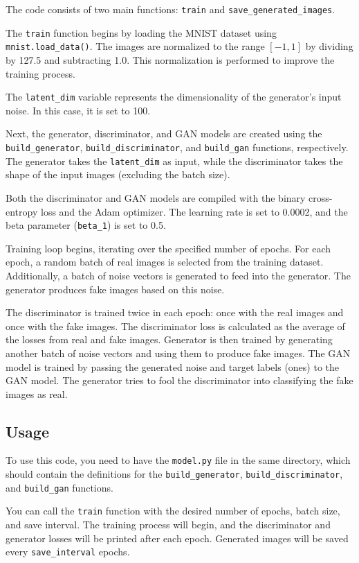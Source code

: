 \documentclass[11pt,a4paper]{article}
\begin{document}
The code consists of two main functions: \texttt{train} and \texttt{save\_generated\_images}.

The \texttt{train} function begins by loading the MNIST dataset using \texttt{mnist.load\_data()}. The images are normalized to the range $[-1, 1]$ by dividing by 127.5 and subtracting 1.0. This normalization is performed to improve the training process.

The \texttt{latent\_dim} variable represents the dimensionality of the generator's input noise. In this case, it is set to 100.

Next, the generator, discriminator, and GAN models are created using the \texttt{build\_generator}, \texttt{build\_discriminator}, and \texttt{build\_gan} functions, respectively. The generator takes the \texttt{latent\_dim} as input, while the discriminator takes the shape of the input images (excluding the batch size).

Both the discriminator and GAN models are compiled with the binary cross-entropy loss and the Adam optimizer. The learning rate is set to 0.0002, and the beta parameter (\texttt{beta\_1}) is set to 0.5.

Training loop begins, iterating over the specified number of epochs. For each epoch, a random batch of real images is selected from the training dataset. Additionally, a batch of noise vectors is generated to feed into the generator. The generator produces fake images based on this noise.

The discriminator is trained twice in each epoch: once with the real images and once with the fake images. The discriminator loss is calculated as the average of the losses from real and fake images. Generator is then trained by generating another batch of noise vectors and using them to produce fake images. The GAN model is trained by passing the generated noise and target labels (ones) to the GAN model. The generator tries to fool the discriminator into classifying the fake images as real.

\subsection{Usage}

To use this code, you need to have the \texttt{model.py} file in the same directory, which should contain the definitions for the \texttt{build\_generator}, \texttt{build\_discriminator}, and \texttt{build\_gan} functions.

You can call the \texttt{train} function with the desired number of epochs, batch size, and save interval. The training process will begin, and the discriminator and generator losses will be printed after each epoch. Generated images will be saved every \texttt{save\_interval} epochs.
\end{document}
